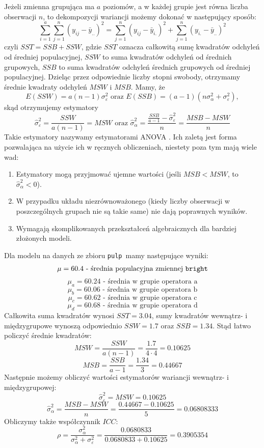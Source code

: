 \documentclass[12pt]{mwbk}
\theoremstyle{plain}
\theoremstyle{definition}
\theoremstyle{remark}
\begin{document}
Jeżeli zmienna grupująca ma $a$ poziomów, a w każdej grupie jest równa liczba obserwacji $n$, to dekompozycji wariancji możemy dokonać w następujący sposób:
$$
\sum_{i=1}^{a} \sum_{j=1}^{n}(y_{ij}-\bar{y}_{..})^2=\sum_{j=1}^{n}(y_{ij}-\bar{y}_{i.})^2+\sum_{j=1}^{n}(y_{i.}-\bar{y}_{..})^2
$$
czyli $SST=SSB+SSW$, gdzie $SST$ oznacza całkowitą sumę kwadratów odchyleń od średniej populacyjnej, $SSW$ to suma kwadratów odchyleń od średnich grupowych, $SSB$ to suma kwadratów odchyleń średnich grupowych od średniej populacyjnej. Dzieląc przez odpowiednie liczby stopni swobody, otrzymamy średnie kwadraty odchyleń $MSW$ i $MSB$. Mamy, że
$$E(SSW)=a(n-1)\sigma_{\varepsilon}^2 \text{ oraz } E(SSB)=(a-1)(n\sigma_{\alpha}^2+\sigma_{\varepsilon}^2),$$
skąd otrzymujemy estymatory
$$\hat{\sigma}_{\varepsilon}^2=\frac{SSW}{a(n-1)}=MSW \text{ oraz } \hat{\sigma}_{\alpha}^2=\frac{\frac{SSB}{a-1}-\hat{\sigma}_{\varepsilon}^2}{n}=\frac{MSB-MSW}{n}$$
Takie estymatory nazywamy estymatorami ANOVA \cite{faraway}. Ich zaletą jest forma pozwalająca na użycie ich w ręcznych obliczeniach, niestety poza tym mają wiele wad:
\begin{enumerate}
	\item Estymatory mogą przyjmować ujemne wartości (jeśli $MSB<MSW$, to $\hat{\sigma}_{\alpha}^2<0$).
	\item W przypadku układu niezrównoważonego (kiedy liczby obserwacji w poszczególnych grupach nie są takie same) nie dają poprawnych wyników.
	\item Wymagają skomplikowanych przekształceń algebraicznych dla bardziej złożonych modeli.
\end{enumerate}  

Dla modelu na danych ze zbioru \texttt{pulp} mamy następujące wyniki:
$$\mu= 60.4\text{ - średnia populacyjna zmiennej \texttt{bright}}$$
$$\mu_a=60.24 \text{ - średnia w grupie operatora a}$$
$$\mu_b=60.06 \text{ - średnia w grupie operatora b}$$
$$\mu_c=60.62 \text{ - średnia w grupie operatora c}$$
$$\mu_d=60.68 \text{ - średnia w grupie operatora d}$$
Całkowita suma kwadratów wynosi $SST=3.04$, sumy kwadratów wewnątrz- i międzygrupowe wynoszą odpowiednio $SSW=1.7$ oraz $SSB=1.34$. Stąd łatwo policzyć średnie kwadratów:
$$MSW=\frac{SSW}{a(n-1)}=\frac{1.7}{4\cdot 4}=0.10625$$
$$MSB=\frac{SSB}{a-1}=\frac{1.34}{3}=0.44667$$
Następnie możemy obliczyć wartości estymatorów wariancji wewnątrz- i międzygrupowej:
$$\hat{\sigma}_{\varepsilon}^2=MSW=0.10625$$
$$\hat{\sigma}_{\alpha}^2=\frac{MSB-MSW}{n}=\frac{0.44667-0.10625}{5}=0.06808333$$
Obliczymy także współczynnik $ICC$:
$$\rho = \frac{\sigma^2_{\alpha}}{\sigma_{\alpha}^2+\sigma_{\varepsilon}^2}=\frac{0.0680833}{0.0680833+0.10625}=0.3905354$$
\end{document}
